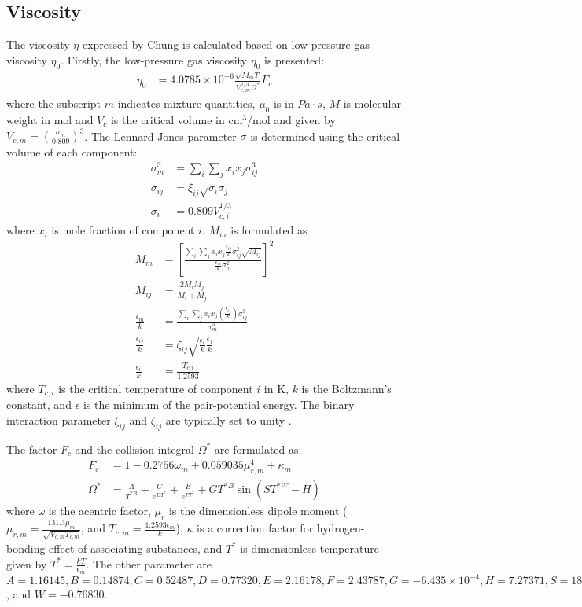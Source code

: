\subsection{Viscosity}
The viscosity $\eta$ expressed by Chung is calculated based on low-pressure gas viscosity $\eta_0$.
Firstly, the low-pressure gas viscosity $\eta_0$ is presented:
\begin{align}
    \eta_0 &= 4.0785 \times 10^{-6} \frac{\sqrt{M_mT}}{V_{c,m}^{2/3}\Omega^*}F_c
\end{align}
where the subscript $m$ indicates mixture quantities, $\mu_0$ is in $Pa\cdot s$, $M$ is molecular weight in mol and $V_{c}$ is the critical volume in $\text{cm}^3/\text{mol}$ and given by $ V_{c,m} =\left(\frac{\sigma_m}{0.809}\right)^3$. The Lennard-Jones parameter $\sigma$ is determined using the critical volume of each component:
\begin{align}
    \sigma_m^3 &= \sum_i\sum_j x_i x_j \sigma_{ij}^3\\
    \sigma_{ij} &= \xi_{ij} \sqrt{\sigma_i \sigma_j}\\
    \sigma_i &= 0.809 V_{c,i}^{1/3}
\end{align}
where $x_i$ is mole fraction of component $i$.
$M_m$ is formulated as
\begin{align}
    M_m &= \left[\frac{\sum_i\sum_j x_i x_j\frac{\epsilon_{ij}}{k}\sigma_{ij}^2\sqrt{M_{ij}}}{\frac{\epsilon_m}{k}\sigma_m^2}\right]^2 \\
    M_{ij} & = \frac{2M_iM_j}{M_i+M_j}\\
    \frac{\epsilon_m}{k} &= \frac{\sum_i\sum_j x_i x_j\left(\frac{\epsilon_{ij}}{k}\right) \sigma_{ij}^3}{\sigma_m^3 }\\
    \frac{\epsilon_{ij}}{k} &= \zeta_{ij} \sqrt{ \frac{\epsilon_{i}}{k} \frac{\epsilon_{j}}{k}}\\
    \frac{\epsilon_i}{k} &= \frac{T_{c,i}}{1.2593}
\end{align}
where $T_{c,i}$ is the critical temperature of component $i$ in K, $k$ is the Boltzmann's constant, and $\epsilon$ is the minimum of the pair-potential energy. The binary interaction parameter $\xi_{ij}$ and $\zeta_{ij}$ are typically set to unity \cite{chung1988generalized}.

The factor $F_c$ and the collision integral $\Omega^*$ are formulated as:
\begin{align}
F_c &= 1-0.2756\omega_m +0.059035 \mu_{r,m}^4+\kappa_m \\
\Omega^* &=\frac{A}{T^{*B}} +\frac{C}{e^{D T^*}} + \frac{E}{e^{F T^*}} +G T^{*B} \sin(ST^{*W} -H)
\end{align}
where $\omega$ is the acentric factor, $\mu_r$ is the dimensionless dipole moment ($\mu_{r,m} = \frac{131.3 \mu_m}{\sqrt{V_{c,m}T_{c,m}}}$, and $T_{c,m} =\frac{1.2593 \epsilon_m}{k}$), $\kappa$ is a correction factor for hydrogen-bonding effect of associating substances, and $T^*$ is dimensionless temperature given by $T^* = \frac{kT}{\epsilon_m}$. The other parameter are $A = 1.16145, B = 0.14874, C = 0.52487, D = 0.77320, E = 2.16178, F = 2.43787, G = -6.435\times 10^{-4}, H = 7.273 71, S = 18.0323$, and $W = -0.768 30$.


